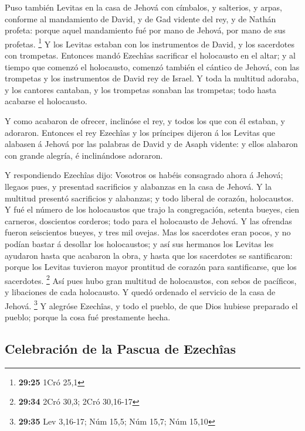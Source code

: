  Puso también Levitas en la casa de Jehová con címbalos, y
salterios, y arpas, conforme al mandamiento de David, y de Gad vidente
del rey, y de Nathán profeta: porque aquel mandamiento fué por mano de
Jehová, por mano de sus profetas. \footnote{\textbf{29:25} 1Cró 25,1}
 Y los Levitas estaban con los instrumentos de David, y los
sacerdotes con trompetas.  Entonces mandó Ezechîas
sacrificar el holocausto en el altar; y al tiempo que comenzó el
holocausto, comenzó también el cántico de Jehová, con las trompetas y
los instrumentos de David rey de Israel.  Y toda la
multitud adoraba, y los cantores cantaban, y los trompetas sonaban las
trompetas; todo hasta acabarse el holocausto.

 Y como acabaron de ofrecer, inclinóse el rey, y todos los
que con él estaban, y adoraron.  Entonces el rey Ezechîas y
los príncipes dijeron á los Levitas que alabasen á Jehová por las
palabras de David y de Asaph vidente: y ellos alabaron con grande
alegría, é inclinándose adoraron.

 Y respondiendo Ezechîas dijo: Vosotros os habéis
consagrado ahora á Jehová; llegaos pues, y presentad sacrificios y
alabanzas en la casa de Jehová. Y la multitud presentó sacrificios y
alabanzas; y todo liberal de corazón, holocaustos.  Y fué
el número de los holocaustos que trajo la congregación, setenta bueyes,
cien carneros, doscientos corderos; todo para el holocausto de Jehová.
 Y las ofrendas fueron seiscientos bueyes, y tres mil
ovejas.  Mas los sacerdotes eran pocos, y no podían bastar
á desollar los holocaustos; y así sus hermanos los Levitas les ayudaron
hasta que acabaron la obra, y hasta que los sacerdotes se santificaron:
porque los Levitas tuvieron mayor prontitud de corazón para
santificarse, que los sacerdotes. \footnote{\textbf{29:34} 2Cró 30,3;
  2Cró 30,16-17}  Así pues hubo gran multitud de
holocaustos, con sebos de pacíficos, y libaciones de cada holocausto. Y
quedó ordenado el servicio de la casa de Jehová. \footnote{\textbf{29:35}
  Lev 3,16-17; Núm 15,5; Núm 15,7; Núm 15,10}  Y alegróse
Ezechîas, y todo el pueblo, de que Dios hubiese preparado el pueblo;
porque la cosa fué prestamente hecha.

\hypertarget{celebraciuxf3n-de-la-pascua-de-ezechuxeeas}{%
\subsection{Celebración de la Pascua de
Ezechîas}\label{celebraciuxf3n-de-la-pascua-de-ezechuxeeas}}

